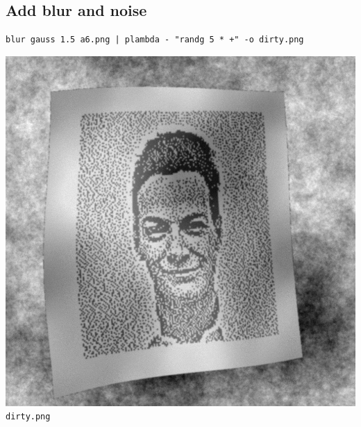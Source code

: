 \subsection{Add blur and noise}
\begin{verbatim}
blur gauss 1.5 a6.png | plambda - "randg 5 * +" -o dirty.png
\end{verbatim}
\includegraphics{dirty.png}\verb+dirty.png+

